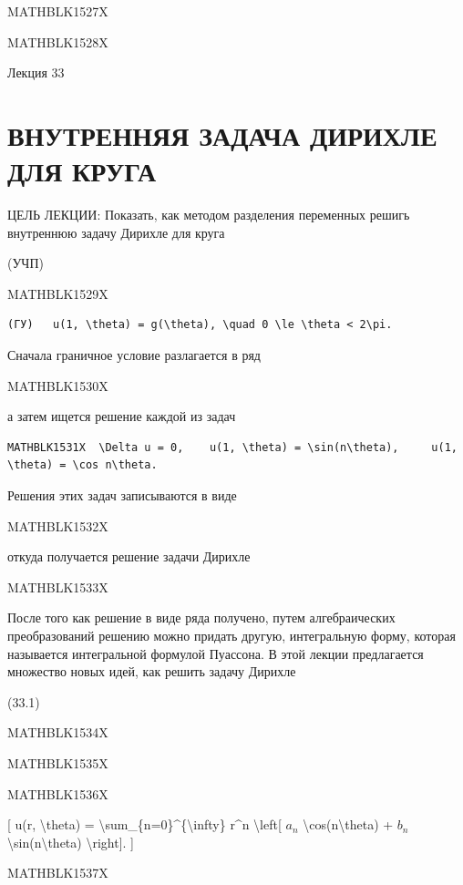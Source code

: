 \documentclass[
]{article}
\begin{document}
{{{MATHBLK1527X

MATHBLK1528X

Лекция 33

\section{ВНУТРЕННЯЯ ЗАДАЧА ДИРИХЛЕ ДЛЯ
КРУГА}\label{ux432ux43dux443ux442ux440ux435ux43dux43dux44fux44f-ux437ux430ux434ux430ux447ux430-ux434ux438ux440ux438ux445ux43bux435-ux434ux43bux44f-ux43aux440ux443ux433ux430}

ЦЕЛЬ ЛЕКЦИИ: Показать, как методом разделения переменных решигь
внутреннюю задачу Дирихле для круга

(УЧП)

MATHBLK1529X

\begin{verbatim}
(ГУ)   u(1, \theta) = g(\theta), \quad 0 \le \theta < 2\pi. 
\end{verbatim}

Сначала граничное условие разлагается в ряд

MATHBLK1530X

а затем ищется решение каждой из задач

\begin{verbatim}
MATHBLK1531X  \Delta u = 0,    u(1, \theta) = \sin(n\theta),     u(1, \theta) = \cos n\theta.
\end{verbatim}

Решения этих задач записываются в виде

MATHBLK1532X

откуда получается решение задачи Дирихле

MATHBLK1533X

После того как решение в виде ряда получено, путем алгебраических
преобразований решению можно придать другую, интегральную форму, которая
называется интегральной формулой Пуассона. В этой лекции предлагается
множество новых идей, как решить задачу Дирихле

(33.1)

MATHBLK1534X

MATHBLK1535X

MATHBLK1536X

{[} u(r, \textbackslash theta) =
\textbackslash sum\_\{n=0\}\^{}\{\textbackslash infty\} r\^{}n
\textbackslash left{[} \(a_n\) \textbackslash cos(n\textbackslash theta)
+ \(b_n\) \textbackslash sin(n\textbackslash theta)
\textbackslash right{]}. {]}

MATHBLK1537X

}}}
\end{document}
